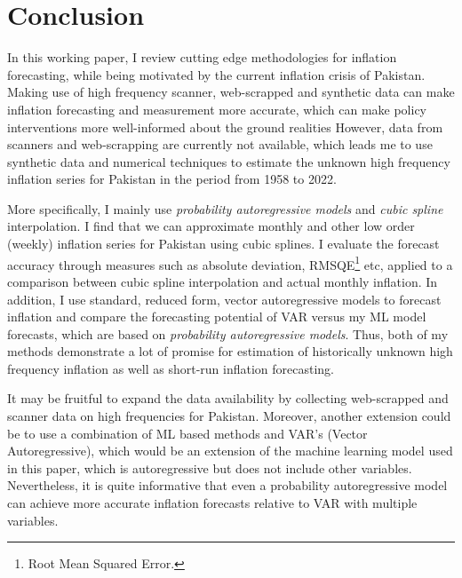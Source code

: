 \documentclass[12pt]{article}
\newcommand{\1}{\mathbbm 1}
\begin{document}
		\section{Conclusion}
		
		In this working paper, I review cutting edge methodologies for inflation forecasting, while being motivated by the current inflation crisis of Pakistan. Making use of high frequency scanner, web-scrapped and synthetic data can make inflation forecasting and measurement more accurate, which can make policy interventions more well-informed about the ground realities However, data from scanners and web-scrapping are currently not available, which leads me to use synthetic data and numerical techniques to estimate the unknown high frequency inflation series for Pakistan in the period from 1958 to 2022.
		
		More specifically, I mainly use \textit{probability autoregressive models} and \textit{cubic spline} interpolation. I find that we can approximate monthly and other low order (weekly) inflation series for Pakistan using cubic splines. I evaluate the forecast accuracy through measures such as absolute deviation, RMSQE\footnote{Root Mean Squared Error.} etc, applied to a comparison between cubic spline interpolation and actual monthly inflation. In addition, I use standard, reduced form, vector autoregressive models to forecast inflation and compare the forecasting potential of VAR versus my ML model forecasts, which are based on \textit{probability autoregressive models}. Thus, both of my methods demonstrate a lot of promise for estimation of historically unknown high frequency inflation as well as short-run inflation forecasting.
		
		It may be fruitful to expand the data availability by collecting web-scrapped and scanner data on high frequencies for Pakistan. Moreover, another extension could be to use a combination of ML based methods and VAR's (Vector Autoregressive), which would be an extension of the machine learning model used in this paper, which is autoregressive but does not include other variables. Nevertheless, it is quite informative that even a probability autoregressive model can achieve more accurate inflation forecasts relative to VAR with multiple variables.
		
		
		
		
		
		
		
		
		
		
		
		
		
\end{document}
